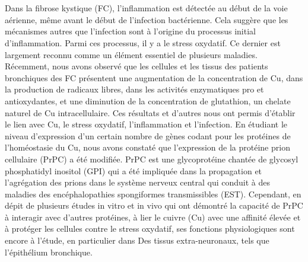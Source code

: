 %
\pdfbookmark[0]{\abstractname}{\abstractname}

\begingroup

\let\clearpage\relax
\let\cleardoublepage\relax
\let\cleardoublepage\relax

\chapter*{\abstractname}\label{sec:abstract}
\vspace*{-10mm}

Dans la fibrose kystique (FC), l'inflammation est détectée au début de la voie aérienne, même avant le début de l'infection bactérienne. Cela suggère que les mécanismes autres que l'infection sont à l'origine du processus initial d'inflammation. Parmi ces processus, il y a le stress oxydatif. Ce dernier est largement reconnu comme un élément essentiel de plusieurs maladies.
Récemment, nous avons observé que les cellules et les tissus des patients bronchiques des FC présentent une augmentation de la concentration de Cu, dans la production de radicaux libres, dans les activités enzymatiques pro et antioxydantes, et une diminution de la concentration de glutathion, un chelate naturel de Cu intracellulaire. Ces résultats et d'autres nous ont permis d'établir le lien avec Cu, le stress oxydatif, l'inflammation et l'infection.
En étudiant le niveau d'expression d'un certain nombre de gènes codant pour les protéines de l'homéostasie du Cu, nous avons constaté que l'expression de la protéine prion cellulaire (PrPC) a été modifiée. PrPC est une glycoprotéine chantée de glycosyl phosphatidyl inositol (GPI) qui a été impliquée dans la propagation et l'agrégation des prions dans le système nerveux central qui conduit à des maladies des encéphalopathies spongiformes transmissibles (EST).
Cependant, en dépit de plusieurs études in vitro et in vivo qui ont démontré la capacité de PrPC à interagir avec d'autres protéines, à lier le cuivre (Cu) avec une affinité élevée et à protéger les cellules contre le stress oxydatif, ses fonctions physiologiques sont encore à l'étude, en particulier dans Des tissus extra-neuronaux, tels que l'épithélium bronchique.
